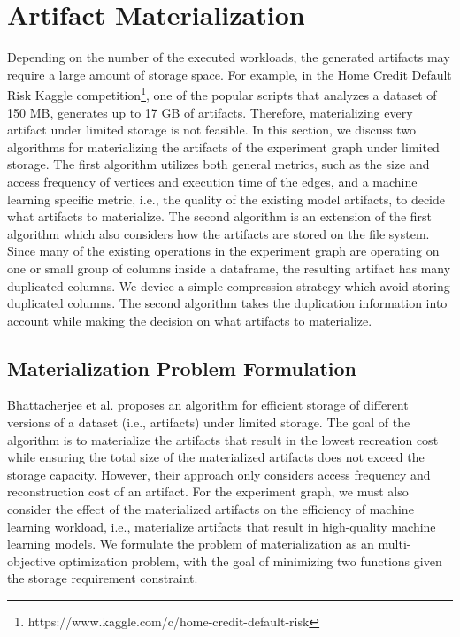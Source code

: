 \section{Artifact Materialization}\label{sec-materialization}
Depending on the number of the executed workloads, the generated artifacts may require a large amount of storage space.
For example, in the Home Credit Default Risk Kaggle competition\footnote{https://www.kaggle.com/c/home-credit-default-risk}, one of the popular scripts that analyzes a dataset of 150 MB, generates up to 17 GB of artifacts.
Therefore, materializing every artifact under limited storage is not feasible.
In this section, we discuss two algorithms for materializing the artifacts of the experiment graph under limited storage.
The first algorithm utilizes both general metrics, such as the size and access frequency of vertices and execution time of the edges, and a machine learning specific metric, i.e., the quality of the existing model artifacts, to decide what artifacts to materialize.
The second algorithm is an extension of the first algorithm which also considers how the artifacts are stored on the file system.
Since many of the existing operations in the experiment graph are operating on one or small group of columns inside a dataframe, the resulting artifact has many duplicated columns.
We device a simple compression strategy which avoid storing duplicated columns.
The second algorithm takes the duplication information into account while making the decision on what artifacts to materialize.

\subsection{Materialization Problem Formulation}\label{subsec-materialization-problem}
Bhattacherjee et al. \cite{bhattacherjee2015principles} proposes an algorithm for efficient storage of different versions of a dataset (i.e., artifacts) under limited storage.
The goal of the algorithm is to materialize the artifacts that result in the lowest recreation cost while ensuring the total size of the materialized artifacts does not exceed the storage capacity.
However, their approach only considers access frequency and reconstruction cost of an artifact.
For the experiment graph, we must also consider the effect of the materialized artifacts on the efficiency of machine learning workload, i.e., materialize artifacts that result in high-quality machine learning models.
We formulate the problem of materialization as an multi-objective optimization problem, with the goal of minimizing two functions given the storage requirement constraint.

